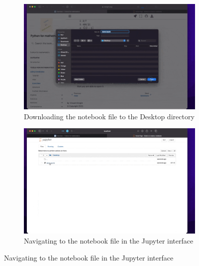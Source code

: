 \begin{enumerate}
        \begin{figure}[!htbp]
                \centering
                \begin{subfigure}[b]{0.3\textwidth}
                    \includegraphics[width=\textwidth]{assets/downloading_a_notebook/main00150.png}
                    \caption{Downloading the notebook file to the Desktop
                    directory}
                    \label{fig:downloading_the_notebook_file_to_the_desktop}
                \end{subfigure}
                \hfill
                \begin{subfigure}[b]{0.3\textwidth}
                    \includegraphics[width=\textwidth]{assets/downloading_a_notebook/main00330.png}
                    \caption{Navigating to the notebook file in the Jupyter
                    interface}
                    \label{fig:navigating_to_the_notebook_file_in_the_jupyter_interface}
                \end{subfigure}
                \hfill

\end{figure}
\end{enumerate}
